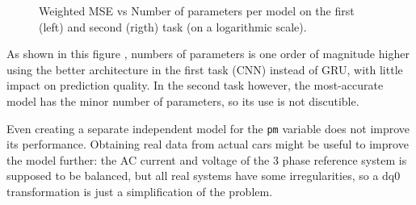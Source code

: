 \begin{figure}[!h]
\begin{subfigure}[b]{0.4\linewidth}
  \end{subfigure}
    \caption{Weighted MSE vs Number of parameters per model on the first (left) and second (rigth) task (on a logarithmic scale).}
    \label{fig:banana}
\end{figure}
  
As shown in this figure%
, numbers of parameters is one order of magnitude higher using the better architecture in the first task (CNN) instead of GRU, with little impact on prediction quality.
In the second task however, the most-accurate model has the minor number of parameters, so its use is not discutible.

Even creating a separate independent model for the \verb|pm| variable does not improve its performance.
Obtaining real data from actual cars might be useful to improve the model further: 
the AC current and voltage of the 3 phase reference system is supposed to be balanced, but all real systems have some irregularities, so a dq0 transformation is just a simplification of the problem.



